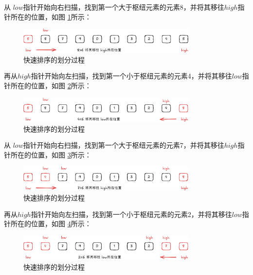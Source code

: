 \documentclass[lang=cn,newtx,10pt,scheme=chinese]{../elegantbook}
\begin{document}
从 $low$指针开始向右扫描，找到第一个大于枢纽元素的元素8，并将其移往$high$指针所在的位置，如图 \ref{fig:patition_b}所示：

\begin{figure}[!htbp]
    \centering
    \includegraphics[width=0.8\textwidth]{./figure/pdf/cropped/patition_b.pdf}
    \caption{快速排序的划分过程}
    \label{fig:patition_b}

    \end{figure}

再从$high$指针开始向左扫描，找到第一个小于枢纽元素的元素4，并将其移往$low$指针所在的位置，如图 \ref{fig:patition_c}所示：

\begin{figure}[!htbp]
    \centering
    \includegraphics[width=0.8\textwidth]{./figure/pdf/cropped/patition_c.pdf}
    \caption{快速排序的划分过程}
    \label{fig:patition_c}
\end{figure}

从 $low$指针开始向右扫描，找到第一个大于枢纽元素的元素7，并将其移往$high$指针所在的位置，如图 \ref{fig:patition_d}所示：

\begin{figure}
[!htbp]
    \centering
    \includegraphics[width=0.8\textwidth]{./figure/pdf/cropped/patition_d.pdf}
    \caption{快速排序的划分过程}
    \label{fig:patition_d}
\end{figure}

再从$high$指针开始向左扫描，找到第一个小于枢纽元素的元素2，并将其移往$low$指针所在的位置，如图 \ref{fig:patition_e}所示：

\begin{figure}
[!htbp]
    \centering
    \includegraphics[width=0.8\textwidth]{./figure/pdf/cropped/patition_e.pdf}
    \caption{快速排序的划分过程}
    \label{fig:patition_e}
\end{figure}
\end{document}
